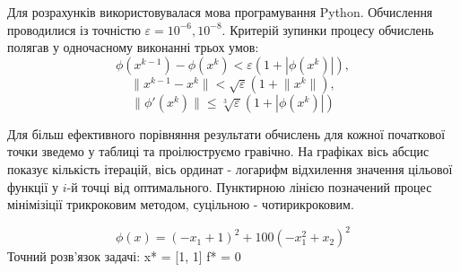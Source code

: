 Для розрахунків використовувалася мова програмування Python. Обчислення проводилися із точністю $\varepsilon = 10^{-6}, 10^{-8}$. Критерій зупинки процесу обчислень полягав у одночасному виконанні трьох умов:
$$
\phi(x^{k-1}) - \phi(x^{k}) < \varepsilon(1 + |\phi(x^{k})|), $$
$$\lVert x^{k-1} - x^{k} \rVert < \sqrt{\varepsilon}(1 + \lVert x^{k} \rVert), $$
$$ \lVert \phi'(x^{k})\rVert \leq \sqrt[3]{\varepsilon}(1 + |\phi(x^{k})|) 
$$

Для більш ефективного порівняння результати обчислень для кожної початкової точки зведемо у таблиці та проілюструємо гравічно. На графіках вісь абсцис показує кількість ітерацій, вісь ординат - логарифм відхилення значення цільової функції у $i$-й точці від оптимального. Пунктирною лінією позначений процес мінімізіції трикроковим методом, суцільною - чотирикроковим.

\begin{example}
	$$\phi(x) = \left(- x_{1} + 1\right)^{2} + 100 \left(- x_{1}^{2} + x_{2}\right)^{2}$$
	Точний розв'язок задачі: x* = [1, 1] f* = 0
\end{example}

